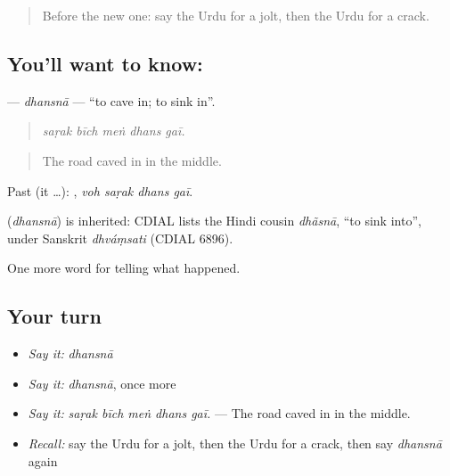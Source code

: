 \label{lesson:UR-C291-dhansna}



\begin{quote}
Before the new one: say the Urdu for a jolt, then the Urdu for a crack.
\end{quote}

\subsection*{You'll want to know: }
\textbf{} — \emph{dhansnā} — \textquotedblleft{}to cave in; to sink in\textquotedblright{}.

\begin{quote}
    
\end{quote}

\begin{quote}
\emph{saṛak bīch meṅ dhans gaī.}
\end{quote}

\begin{quote}
The road caved in in the middle.
\end{quote}

Past (it …):    , \emph{voh saṛak dhans gaī}.

\begin{cousinweb}
\textbf{} (\emph{dhansnā}) is inherited: CDIAL lists the Hindi cousin \emph{dhãsnā}, \textquotedblleft{}to sink into\textquotedblright{}, under Sanskrit \emph{dhváṃsati} (CDIAL 6896).
\end{cousinweb}

\begin{grammarlens}[title={What you've built}]
One more word for telling what happened.
\end{grammarlens}

\subsection*{Your turn}
\begin{itemize}
\raggedright
  \item \emph{Say it:} \emph{dhansnā}
  \item \emph{Say it:} \emph{dhansnā}, once more
  \item \emph{Say it:} \emph{saṛak bīch meṅ dhans gaī.} — The road caved in in the middle.
  \item \emph{Recall:} say the Urdu for a jolt, then the Urdu for a crack, then say \emph{dhansnā} again
\end{itemize}

